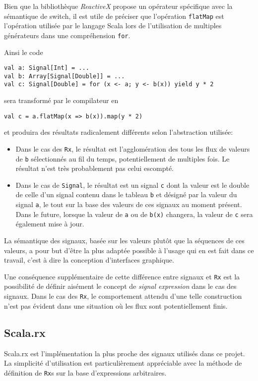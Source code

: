 Bien que la bibliothèque \emph{ReactiveX} propose un opérateur spécifique avec la sémantique de switch, il est utile de préciser que l'opération \texttt{flatMap} est l'opération utilisée par le langage Scala lors de l'utilisation de multiples générateurs dans une compréhension \texttt{for}.

Ainsi le code
\begin{lstlisting}
val a: Signal[Int] = ...
val b: Array[Signal[Double]] = ...
val c: Signal[Double] = for (x <- a; y <- b(x)) yield y * 2
\end{lstlisting}

sera transformé par le compilateur en
\begin{lstlisting}
val c = a.flatMap(x => b(x)).map(y * 2)
\end{lstlisting}

et produira des résultats radicalement différents selon l'abstraction utilisée:

\begin{itemize}
	\item Dans le cas des \texttt{Rx}, le résultat est l'agglomération des tous les flux de valeurs de \texttt{b} sélectionnés au fil du temps, potentiellement de multiples fois. Le résultat n'est très probablement pas celui escompté.
	
	\item Dans le cas de \texttt{Signal}, le résultat est un signal \texttt{c} dont la valeur est le double de celle d'un signal contenu dans le tableau \texttt{b} et désigné par la valeur du signal \texttt{a}, le tout sur la base des valeurs de ces signaux au moment présent. Dans le future, lorsque la valeur de \texttt{a} ou de \texttt{b(x)} changera, la valeur de \texttt{c} sera également mise à jour.
\end{itemize}

La sémantique des signaux, basée sur les valeurs plutôt que la séquences de ces valeurs, a pour but d'être la plus adaptée possible à l'usage qui en est fait dans ce travail, c'est à dire la conception d'interfaces graphique.

Une conséquence supplémentaire de cette différence entre signaux et \texttt{Rx} est la possibilité de définir aisément le concept de \emph{signal expression} dans le cas des signaux. Dans le cas des \texttt{Rx}, le comportement attendu d'une telle construction n'est pas évident dans une situation où les flux sont potentiellement finis.

\subsection{Scala.rx} \label{sec:sig-comp-scalarx}
Scala.rx est l'implémentation la plus proche des signaux utilisés dans ce projet. La simplicité d'utilisation est particulièrement appréciable avec la méthode de définition de \texttt{Rx}s sur la base d'expressions arbitraires.

